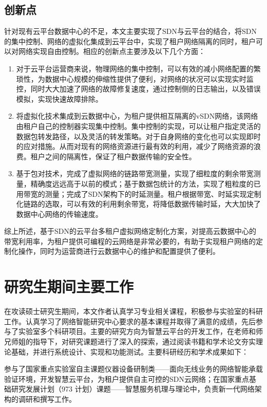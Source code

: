 \subsection{创新点}
针对现有云平台数据中心的不足，本文主要实现了SDN与云平台的结合，将SDN的集中控制、网络的虚拟化集成到云平台中，实现了租户网络隔离的同时，租户可以对网络实现自由控制。相应的创新点主要涉及以下几个方面：

\begin{enumerate}
\item 对于云平台运营商来说，物理网络的集中控制，可以有效的减小网络配置的繁琐性，为数据中心规模的伸缩性提供了便利，对网络的状况可以实现实时监控，同时大大加速了网络的故障修复速度，通过控制侧的日志输出，以及错误模拟，实现快速故障排除。
\item 将虚拟化技术集成到云数据中心，为租户提供相互隔离的vSDN网络，该网络由租户自己的控制器实现集中控制。集中控制的实现，可以让租户指定灵活的数据包转发路径，以及灵活的转发策略。对于自身网络的变化也可以实现即时的应对措施。从而对现有的网络资源进行最有效的利用，减少了网络资源的浪费。租户之间的隔离性，保证了租户数据传输的安全性。
\item 基于包对技术，完成了虚拟网络的链路带宽测量，实现了细粒度的剩余带宽测量，精确度远远高于以前的模式；基于数据包统计的方法，实现了粗粒度的已用带宽的测量；完成了SDN架构下的时延测量。租户根据带宽、时延实现定制化链路的选取，可以有效的利用剩余带宽，将降低数据传输时延，大大加快了数据中心网络的传输速度。
\end{enumerate}

综上所述，基于SDN的云平台多租户虚拟网络定制化方案，对提高云数据中心的带宽利用率，为租户提供可编程的云网络是非常必要的，有助于实现租户网络的定制化操作，同时为运营商进行云数据中心的维护和配置提供了便利。

\section{研究生期间主要工作}
在攻读硕士研究生期间，本文作者认真学习专业相关课程，积极参与实验室的科研工作。认真学习了网络智能研究中心要求的基本课程并取得了满意的成绩，先后参与了实验室多个科研项目。主要的研究方向为智慧云平台的开发工作，在老师和师兄师姐的指导下，对研究课题进行了深入的探索，通过阅读书籍和学术论文夯实理论基础，并进行系统设计、实现和功能测试。主要科研经历和学术成果如下：

参与了国家重点实验室自主课题仪器设备研制类——面向无线业务的网络智能承载验证环境，开发智慧云平台，为租户提供自主可控的SDN云网络；在国家重点基础研究发展计划（973 计划）课题——智慧服务机理与理论中，负责新一代网络架构的调研和撰写工作。

